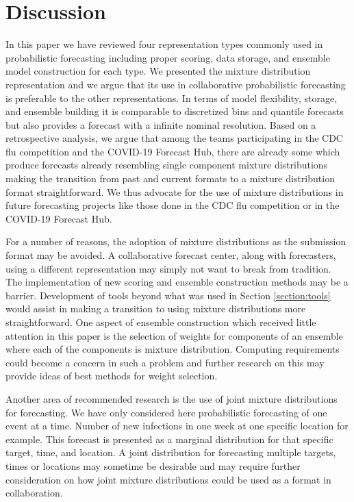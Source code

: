 \documentclass[11pt,notitlepage]{isuthesis}
\begin{document}
\chapter{Discussion}

In this paper we have reviewed four representation types commonly used in
probabilistic 
forecasting including proper scoring, data storage, and ensemble model 
construction for each type. We presented the mixture distribution
representation and we argue that its use in collaborative probabilistic 
forecasting is preferable to the other representations.
In terms of model flexibility, storage, and 
ensemble building it is
comparable to discretized bins and quantile forecasts but also provides a 
forecast with a infinite nominal resolution. Based on a retrospective analysis,
we argue that among the teams participating in the CDC flu
competition and the COVID-19 Forecast Hub, there are already some which produce
forecasts already resembling single component mixture distributions making the 
transition from past and current formats to a mixture distribution format 
straightforward.
We thus advocate for the use of mixture distributions in
future forecasting projects like those done in the CDC flu competition or in the
COVID-19 Forecast Hub.

For a number of reasons, the adoption of mixture distributions as the
submission format may be avoided. A collaborative forecast center, along with 
forecasters, using a 
different representation may simply not want to break from tradition. The 
implementation of new scoring and ensemble construction methods may be a 
barrier. Development of tools beyond what was used in Section 
\ref{section:tools} would assist in making a transition to using mixture 
distributions more straightforward.
One aspect of ensemble construction which received little attention in 
this paper is the selection of weights for components of an ensemble where each
of the components is mixture distribution. Computing requirements could become a
concern in such a problem and further research on this may provide
ideas of best methods for weight selection.

Another area of recommended research is the use of joint mixture distributions 
for 
forecasting. We have only considered here probabilistic forecasting of one 
event at a time. Number of new infections in one week at one specific location
for example. This forecast is presented as a marginal distribution for that 
specific target, time, and location. A joint distribution for forecasting 
multiple targets, times or locations may sometime be desirable and may require
further consideration on how joint mixture distributions could be used as a 
format in collaboration.
\end{document}

